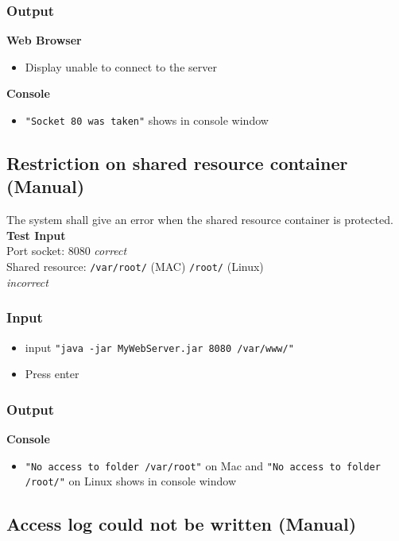\documentclass[a4paper, 12pt]{article}
\begin{document}
\subsubsection{Output}
\textbf{Web Browser}
\begin{itemize}
\item Display unable to connect to the server
\end{itemize}

\textbf{Console}
\begin{itemize}
\item \texttt{"Socket 80 was taken"} shows in console window
\end{itemize}

\subsection{Restriction on shared resource container (Manual)}

The system shall give an error when the shared resource container is protected.\\
\textbf{Test Input} \\ Port socket: 8080 \textit{correct} \\ Shared resource: \texttt{/var/root/} (MAC) \texttt{/root/} (Linux) \\ \textit{incorrect}
 
\subsubsection{Input}
\begin{itemize}
\item input \texttt{"java -jar MyWebServer.jar 8080 /var/www/"}
\item Press enter
\end{itemize} 

\subsubsection{Output}
\textbf{Console}
\begin{itemize}
\item \texttt{"No access to folder /var/root"} on Mac and \texttt{"No access to folder /root/"} on Linux shows in console window
\end{itemize}

\subsection{Access log could not be written (Manual)}
\end{document}
